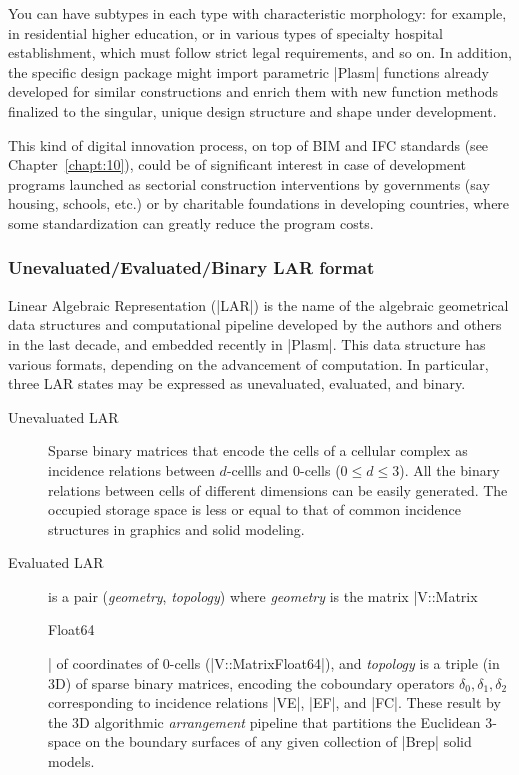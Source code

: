 \begin{coding}
\begin{remark}
You can have subtypes in each type with characteristic morphology: for example, in residential higher education, or in various types of specialty hospital establishment, which must follow strict legal requirements, and so on.
In addition, the specific design package might import parametric |Plasm| functions already developed for similar constructions and enrich them with new function methods finalized to the singular, unique design structure and shape under development.
\end{remark}

This kind of digital innovation process, on top of BIM and IFC standards (see Chapter~\ref{chapt:10}), could be of significant interest in case of development programs launched as sectorial construction interventions by governments (say housing, schools, etc.) or by charitable foundations in developing countries, where some standardization can greatly reduce the program costs.
 

\subsubsection*{Unevaluated/Evaluated/Binary LAR format}\label{sect:4-6-2}

Linear Algebraic Representation (|LAR|) is the name of the algebraic geometrical data structures and computational pipeline developed by the authors and others in the last decade, and embedded recently in |Plasm|. This data structure has various formats, depending on the advancement of computation. In particular, three LAR states may be expressed as unevaluated, evaluated, and binary.

\begin{description} 
\item[Unevaluated LAR] Sparse binary matrices that encode the cells of a cellular complex as incidence relations between $d$-cellls and $0$-cells ($0 \leq d \leq 3$). All the binary relations between cells of different dimensions can be easily generated. The occupied storage space is less or equal to that of common incidence structures in graphics and solid modeling.

\item[Evaluated LAR] is a pair (\emph{geometry}, \emph{topology}) where \emph{geometry} is the matrix |V::Matrix{Float64{| of coordinates of 0-cells (|V::Matrix{Float64}|), and \emph{topology} is a triple (in 3D) of sparse binary matrices, encoding the coboundary operators $\delta_0, \delta_1, \delta_2$ corresponding to incidence relations |VE|, |EF|, and |FC|. These result by the 3D algorithmic \emph{arrangement} pipeline that partitions the Euclidean 3-space on the boundary surfaces of any given collection of |Brep| solid models.

}}
\end{description}
\end{coding}
